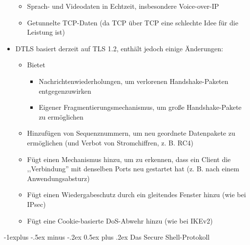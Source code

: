 \documentclass[a4paper]{article}
\makeatletter
\renewcommand{\subsection}{\@startsection{subsection}{2}{0mm}%
 {-1explus -.5ex minus -.2ex}%
 {0.5ex plus .2ex}%
 {\normalfont\normalsize\bfseries}}
\makeatother
\begin{document}
\begin{multicols}{3}
\begin{itemize}
              \begin{itemize}
                  \item
                        Sprach- und Videodaten in Echtzeit, insbesondere Voice-over-IP
                  \item
                        Getunnelte TCP-Daten (da TCP über TCP eine schlechte Idee für die
                        Leistung ist)
              \end{itemize}
        \item
              DTLS basiert derzeit auf TLS 1.2, enthält jedoch einige Änderungen:

              \begin{itemize}
                  \item
                        Bietet

                        \begin{itemize}
                            \item
                                  Nachrichtenwiederholungen, um verlorenen Handshake-Paketen
                                  entgegenzuwirken
                            \item
                                  Eigener Fragmentierungsmechanismus, um große Handshake-Pakete zu
                                  ermöglichen
                        \end{itemize}
                  \item
                        Hinzufügen von Sequenznummern, um neu geordnete Datenpakete zu
                        ermöglichen (und Verbot von Stromchiffren, z. B. RC4)
                  \item
                        Fügt einen Mechanismus hinzu, um zu erkennen, dass ein Client die
                        ,,Verbindung'' mit denselben Ports neu gestartet hat (z. B. nach
                        einem Anwendungsabsturz)
                  \item
                        Fügt einen Wiedergabeschutz durch ein gleitendes Fenster hinzu (wie
                        bei IPsec)
                  \item
                        Fügt eine Cookie-basierte DoS-Abwehr hinzu (wie bei IKEv2)
              \end{itemize}
    \end{itemize}


    \subsection{Das Secure
        Shell-Protokoll}


\end{multicols}
\end{document}
